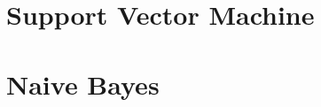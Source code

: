 % 
% 



% 
% 

% 
% 

% 
% 


 \section[SVM]{Support Vector Machine}



 \section[NB]{Naive Bayes}




% 
% 

% 
% 



